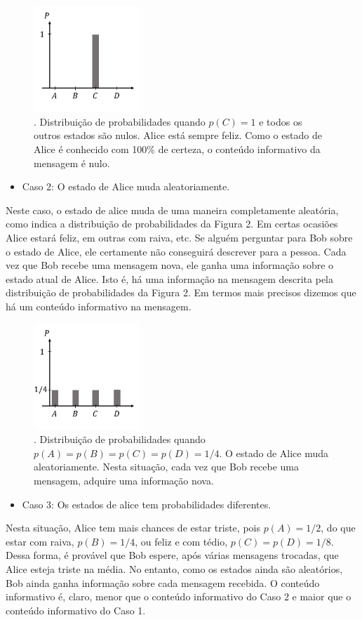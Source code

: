 \documentclass{article}
\begin{document}
\begin{figure}[h]
\centering
\includegraphics[width=4cm]{caso1.pdf}
\captionsetup{labelsep=none}
\caption{. Distribuição de probabilidades quando $p(C) = 1$ e todos os outros estados são nulos. Alice está sempre feliz. Como o estado de Alice é conhecido com 100\% de certeza, o conteúdo informativo da mensagem é nulo. }
\end{figure}
\newpage 
\begin{itemize}
    \item Caso 2: O estado de Alice muda aleatoriamente.
\end{itemize}
Neste caso, o estado de alice muda de uma maneira completamente aleatória, como indica a distribuição de probabilidades da Figura 2. Em certas ocasiões Alice estará feliz, em outras com raiva, etc. Se alguém perguntar para Bob sobre o estado de Alice, ele certamente não conseguirá descrever para a pessoa. Cada vez que Bob recebe uma mensagem nova, ele ganha uma informação sobre o estado atual de Alice. Isto é, há uma informação na mensagem descrita pela distribuição de probabilidades da Figura 2. Em termos mais precisos dizemos que há um conteúdo informativo na mensagem.
\begin{figure}[h]
\centering
\includegraphics[width=4cm]{caso2.pdf}
\captionsetup{labelsep=none}
\caption{. Distribuição de probabilidades quando $p(A) = p(B) = p(C) = p(D) = 1/4$. O estado de Alice muda aleatoriamente. Nesta situação, cada vez que Bob recebe uma mensagem, adquire uma informação nova. }
\end{figure}

\begin{itemize}
    \item Caso 3: Os estados de alice tem probabilidades diferentes.
\end{itemize}
Nesta situação, Alice tem mais chances de estar triste, pois $p(A) = 1/2$, do que estar com raiva, $p(B) = 1/4$, ou feliz e com tédio, $p(C) = p(D) = 1/8$. Dessa forma, é provável que Bob espere, após várias mensagens trocadas, que Alice esteja triste na média. No entanto, como os estados ainda são aleatórios, Bob ainda ganha informação sobre cada mensagem recebida. O conteúdo informativo é, claro, menor que o conteúdo informativo do Caso 2 e maior que o conteúdo informativo do Caso 1.
\end{document}
